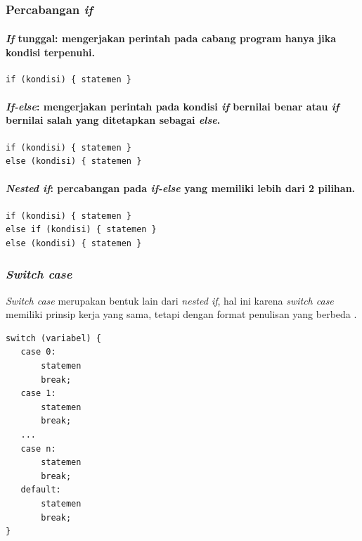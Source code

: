 \documentclass[../main.tex]{subfiles}
\begin{document}
\subsection{{\Statement} {\Control}}
\subsubsection{Percabangan \textit{if}}

\paragraph{\textit{If} tunggal: mengerjakan perintah pada cabang program hanya jika kondisi terpenuhi.}

\begin{code}[r]
\begin{verbatim}
if (kondisi) { statemen }
\end{verbatim}
\end{code}

\paragraph{\textit{If-else}: mengerjakan perintah pada kondisi \textit{if} bernilai benar atau \textit{if} bernilai salah yang ditetapkan sebagai \textit{else}.}

\begin{code}[r]
\begin{verbatim}
if (kondisi) { statemen }
else (kondisi) { statemen }
\end{verbatim}
\end{code}

\paragraph{\textit{Nested if}: percabangan pada \textit{if-else} yang memiliki lebih dari 2 pilihan.}

\begin{code}[r]
\begin{verbatim}
if (kondisi) { statemen }
else if (kondisi) { statemen }
else (kondisi) { statemen }
\end{verbatim}
\end{code}

\subsubsection{\textit{Switch case}}
\begin{indentpar}\hpar{}
\textit{Switch case} merupakan bentuk lain dari \textit{nested if}, hal ini karena \textit{switch case} memiliki prinsip kerja yang sama, tetapi dengan format penulisan yang berbeda \parencite{hanief2020konsep}.
\end{indentpar}
\vspace{-1ex}
\begin{code}[n]
\begin{verbatim}
switch (variabel) {
   case 0:
       statemen
       break;
   case 1:
       statemen
       break;
   ...
   case n:
       statemen
       break;
   default:
       statemen
       break;
}
\end{verbatim}
\end{code}
\end{document}
